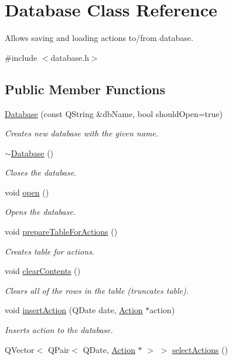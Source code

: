 \hypertarget{class_database}{\section{Database Class Reference}
\label{class_database}
}


Allows saving and loading actions to/from database.  




{\ttfamily \#include $<$database.\-h$>$}

\subsection*{Public Member Functions}
\begin{DoxyCompactItemize}
\item 
\hyperlink{class_database_a6714790c71898430c995668a06350dfe}{Database} (const Q\-String \&db\-Name, bool should\-Open=true)
\begin{DoxyCompactList}\small\item\em Creates new database with the given name. \end{DoxyCompactList}\item 
\hyperlink{class_database_a84d399a2ad58d69daab9b05330e1316d}{$\sim$\-Database} ()
\begin{DoxyCompactList}\small\item\em Closes the database. \end{DoxyCompactList}\item 
void \hyperlink{class_database_a0d0134e05c8f2dc4fcbbb2f36c02a779}{open} ()
\begin{DoxyCompactList}\small\item\em Opens the database. \end{DoxyCompactList}\item 
void \hyperlink{class_database_a7fd3f2692980d3aadd3cb609a5f958c3}{prepare\-Table\-For\-Actions} ()
\begin{DoxyCompactList}\small\item\em Creates table for actions. \end{DoxyCompactList}\item 
void \hyperlink{class_database_a704e65b47bb56b36b7ef436a16fdd0a6}{clear\-Contents} ()
\begin{DoxyCompactList}\small\item\em Clears all of the rows in the table (truncates table). \end{DoxyCompactList}\item 
void \hyperlink{class_database_a8b535ecf44b6d41e268750acccf40dc1}{insert\-Action} (Q\-Date date, \hyperlink{class_action}{Action} $\ast$action)
\begin{DoxyCompactList}\small\item\em Inserts action to the database. \end{DoxyCompactList}\item 
Q\-Vector$<$ Q\-Pair$<$ Q\-Date, \hyperlink{class_action}{Action} $\ast$ $>$ $>$ \hyperlink{class_database_ad796e97b41e4a8707017f70142c6160d}{select\-Actions} ()
\end{DoxyCompactItemize}
